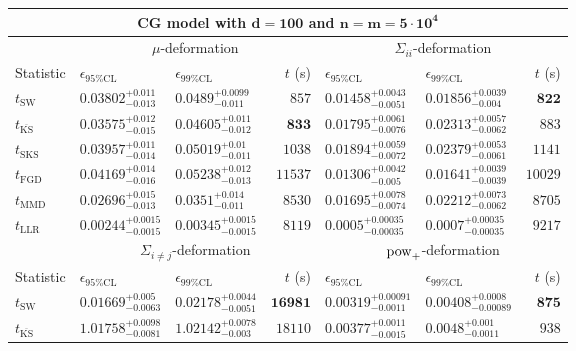 \begin{tabular}{l|llr|llr}
	\toprule
	\multicolumn{7}{c}{{\bf CG model with $\mathbf{d=100}$ and $\mathbf{n=m=5\cdot 10^{4}}$}} \\
	\toprule
	\multicolumn{1}{c}{} & \multicolumn{3}{c}{$\mu$-deformation} & \multicolumn{3}{c}{$\Sigma_{ii}$-deformation} \\
	Statistic & $\epsilon_{95\%\mathrm{CL}}$ & $\epsilon_{99\%\mathrm{CL}}$ & $t$ (s) & $\epsilon_{95\%\mathrm{CL}}$ & $\epsilon_{99\%\mathrm{CL}}$ & $t$ (s) \\
	\midrule
	$t_{\mathrm{SW}}$ & $0.03802_{-0.013}^{+0.011}$ & $0.0489_{-0.011}^{+0.0099}$ & $857$ & $0.01458_{-0.0051}^{+0.0043}$ & $0.01856_{-0.004}^{+0.0039}$ & ${\mathbf{822}}$ \\
	$t_{\overline{\mathrm{KS}}}$ & $0.03575_{-0.015}^{+0.012}$ & $0.04605_{-0.012}^{+0.011}$ & ${\mathbf{833}}$ & $0.01795_{-0.0076}^{+0.0061}$ & $0.02313_{-0.0062}^{+0.0057}$ & $883$ \\
	$t_{\mathrm{SKS}}$ & $0.03957_{-0.014}^{+0.011}$ & $0.05019_{-0.011}^{+0.01}$ & $1038$ & $0.01894_{-0.0072}^{+0.0059}$ & $0.02379_{-0.0061}^{+0.0053}$ & $1141$ \\
	$t_{\mathrm{FGD}}$ & $0.04169_{-0.016}^{+0.014}$ & $0.05238_{-0.013}^{+0.012}$ & $11537$ & ${\mathbf{0.01306_{-0.005}^{+0.0042}}}$ & ${\mathbf{0.01641_{-0.0039}^{+0.0039}}}$ & $10029$ \\
	$t_{\mathrm{MMD}}$ & ${\mathbf{0.02696_{-0.013}^{+0.015}}}$ & ${\mathbf{0.0351_{-0.011}^{+0.014}}}$ & $8530$ & $0.01695_{-0.0074}^{+0.0078}$ & $0.02212_{-0.0062}^{+0.0073}$ & $8705$ \\
	$t_{\mathrm{LLR}}$ & $0.00244_{-0.0015}^{+0.0015}$ & $0.00345_{-0.0015}^{+0.0015}$ & $8119$ & $0.0005_{-0.00035}^{+0.00035}$ & $0.0007_{-0.00035}^{+0.00035}$ & $9217$ \\
	\toprule
	\multicolumn{1}{c}{} & \multicolumn{3}{c}{$\Sigma_{i\neq j}$-deformation} & \multicolumn{3}{c}{$\rm{pow}_{+}$-deformation} \\
	Statistic & $\epsilon_{95\%\mathrm{CL}}$ & $\epsilon_{99\%\mathrm{CL}}$ & $t$ (s) & $\epsilon_{95\%\mathrm{CL}}$ & $\epsilon_{99\%\mathrm{CL}}$ & $t$ (s) \\
	\midrule
	$t_{\mathrm{SW}}$ & $0.01669_{-0.0063}^{+0.005}$ & $0.02178_{-0.0051}^{+0.0044}$ & ${\mathbf{16981}}$ & $0.00319_{-0.0011}^{+0.00091}$ & $0.00408_{-0.00089}^{+0.0008}$ & ${\mathbf{875}}$ \\
	$t_{\overline{\mathrm{KS}}}$ & $1.01758_{-0.0081}^{+0.0098}$ & $1.02142_{-0.003}^{+0.0078}$ & $18110$ & $0.00377_{-0.0015}^{+0.0011}$ & $0.0048_{-0.0011}^{+0.001}$ & $938$ \\

\end{tabular}
